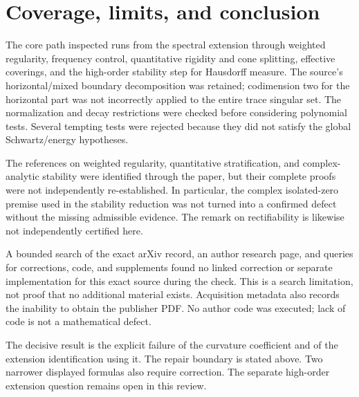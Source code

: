 \documentclass[10pt]{article}
\begin{document}
\section*{Coverage, limits, and conclusion}
The core path inspected runs from the spectral extension through weighted regularity, frequency control, quantitative rigidity and cone splitting, effective coverings, and the high-order stability step for Hausdorff measure. The source’s horizontal/mixed boundary decomposition was retained; codimension two for the horizontal part was not incorrectly applied to the entire trace singular set. The normalization and decay restrictions were checked before considering polynomial tests. Several tempting tests were rejected because they did not satisfy the global Schwartz/energy hypotheses.\par
The references on weighted regularity, quantitative stratification, and complex-analytic stability were identified through the paper, but their complete proofs were not independently re-established. In particular, the complex isolated-zero premise used in the stability reduction was not turned into a confirmed defect without the missing admissible evidence. The remark on rectifiability is likewise not independently certified here.\par
A bounded search of the exact arXiv record, an author research page, and queries for corrections, code, and supplements found no linked correction or separate implementation for this exact source during the check. This is a search limitation, not proof that no additional material exists. Acquisition metadata also records the inability to obtain the publisher PDF. No author code was executed; lack of code is not a mathematical defect.\par
The decisive result is the explicit failure of the curvature coefficient and of the extension identification using it. The repair boundary is stated above. Two narrower displayed formulas also require correction. The separate high-order extension question remains open in this review.\par
\end{document}
